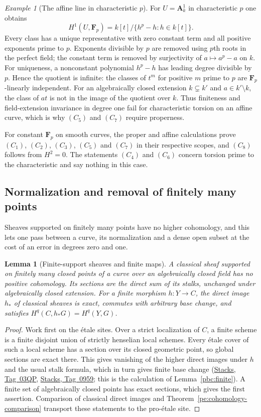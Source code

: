 \documentclass[11pt,a4paper]{article}
\numberwithin{equation}{section}
\newtheorem{lemma}[theorem]{Lemma}
\theoremstyle{definition}
\theoremstyle{remark}
\newcommand{\stacks}[1]{\href{https://stacks.math.columbia.edu/tag/#1}{\textnormal{Stacks, Tag~#1}}}
\newcommand{\A}{\mathbf A}
\newtheorem{example}[theorem]{Example}
\begin{document}
\begin{example}[The affine line in characteristic $p$]
\label{app:curve-wild-example}
For $U=\A^1_k$ in characteristic $p$ one obtains
\[
 H^1(U,\mathbf F_p)=k[t]/\{h^p-h:h\in k[t]\}.
\]
Every class has a unique representative with zero constant term
and all positive exponents prime to $p$.  Exponents divisible by
$p$ are removed using $p$th roots in the perfect field; the constant
term is removed by surjectivity of $a\mapsto a^p-a$ on $k$.
For uniqueness, a nonconstant polynomial $h^p-h$ has leading
degree divisible by $p$.  Hence the quotient is infinite: the classes
of $t^m$ for positive $m$ prime to $p$ are $\mathbf F_p$-linearly
independent.  For an algebraically closed extension $k\subsetneq k'$
and $a\in k'\setminus k$, the class of $at$ is not in the image of the
quotient over $k$.  Thus finiteness and field-extension invariance in
degree one fail for characteristic torsion on an affine curve, which
is why $(C_5)$ and $(C_7)$ require properness.
\end{example}

For constant $\mathbf F_p$ on smooth curves, the proper and affine
calculations prove $(C_1)$, $(C_2)$, $(C_3)$, $(C_5)$ and $(C_7)$ in
their respective scopes, and $(C_8)$ follows from $H^2=0$.  The
statements $(C_4)$ and $(C_6)$ concern torsion prime to the
characteristic and say nothing in this case.

\subsection{Normalization and removal of finitely many points}

Sheaves supported on finitely many points have no higher cohomology,
and this lets one pass between a curve, its normalization and a dense
open subset at the cost of an error in degrees zero and one.

\begin{lemma}[Finite-support sheaves and finite maps]
\label{app:curve-finite-support}
A classical sheaf supported on finitely many closed points of a
curve over an algebraically closed field has no positive cohomology.
Its sections are the direct sum of its stalks, unchanged under
algebraically closed extension.  For a finite morphism $h\colon Y\to C$,
the direct image $h_*$ of classical sheaves is exact, commutes with
arbitrary base change, and satisfies $H^q(C,h_*G)=H^q(Y,G)$.
\end{lemma}
\begin{proof}
Work first on the \'etale sites.  Over a strict localization of $C$,
a finite scheme is a finite disjoint union of strictly henselian local
schemes.  Every \'etale cover of such a local scheme has a section over
its closed geometric point, so global sections are exact there.  This
gives vanishing of the higher direct images under $h$ and the usual
stalk formula, which in turn gives finite base change (\stacks{03QP},
\stacks{0959}; this is the calculation of Lemma~\ref{pbc:finite}).  A
finite set of algebraically closed points has exact sections, which
gives the first assertion.  Comparison of classical direct images and
Theorem~\ref{pe:cohomology-comparison} transport these statements to
the pro-\'etale site.
\end{proof}
\end{document}
